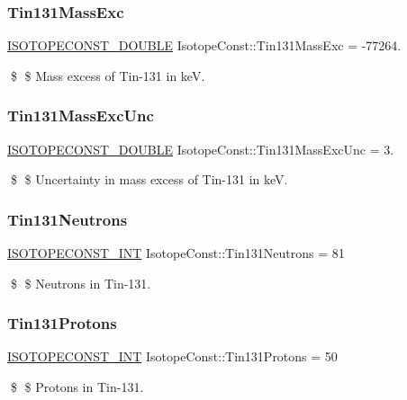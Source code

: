 \subsubsection{\texorpdfstring{Tin131\+Mass\+Exc}{Tin131MassExc}}
{\footnotesize\ttfamily \mbox{\hyperlink{group___isotope_const-_macros_ga8f45a7272ce02c0b4c65c44636ed719a}{I\+S\+O\+T\+O\+P\+E\+C\+O\+N\+S\+T\+\_\+\+D\+O\+U\+B\+LE}} Isotope\+Const\+::\+Tin131\+Mass\+Exc = -\/77264.}

\$ \$ Mass excess of Tin-\/131 in keV. \mbox{\label{group___isotope_const-_tin-_sn131_gaac80081d1e0c045df7f1fecefcd39bb4}} 
\subsubsection{\texorpdfstring{Tin131\+Mass\+Exc\+Unc}{Tin131MassExcUnc}}
{\footnotesize\ttfamily \mbox{\hyperlink{group___isotope_const-_macros_ga8f45a7272ce02c0b4c65c44636ed719a}{I\+S\+O\+T\+O\+P\+E\+C\+O\+N\+S\+T\+\_\+\+D\+O\+U\+B\+LE}} Isotope\+Const\+::\+Tin131\+Mass\+Exc\+Unc = 3.}

\$ \$ Uncertainty in mass excess of Tin-\/131 in keV. \mbox{\label{group___isotope_const-_tin-_sn131_gaeebbbfd106851f76d4cc36c0352f2afc}} 
\subsubsection{\texorpdfstring{Tin131\+Neutrons}{Tin131Neutrons}}
{\footnotesize\ttfamily \mbox{\hyperlink{group___isotope_const-_macros_ga5f18360b3e99483a35c32d789e62621c}{I\+S\+O\+T\+O\+P\+E\+C\+O\+N\+S\+T\+\_\+\+I\+NT}} Isotope\+Const\+::\+Tin131\+Neutrons = 81}

\$ \$ Neutrons in Tin-\/131. \mbox{\label{group___isotope_const-_tin-_sn131_gafff1955ce0beea9377dc5ab3fc5da9de}} 
\subsubsection{\texorpdfstring{Tin131\+Protons}{Tin131Protons}}
{\footnotesize\ttfamily \mbox{\hyperlink{group___isotope_const-_macros_ga5f18360b3e99483a35c32d789e62621c}{I\+S\+O\+T\+O\+P\+E\+C\+O\+N\+S\+T\+\_\+\+I\+NT}} Isotope\+Const\+::\+Tin131\+Protons = 50}

\$ \$ Protons in Tin-\/131. 